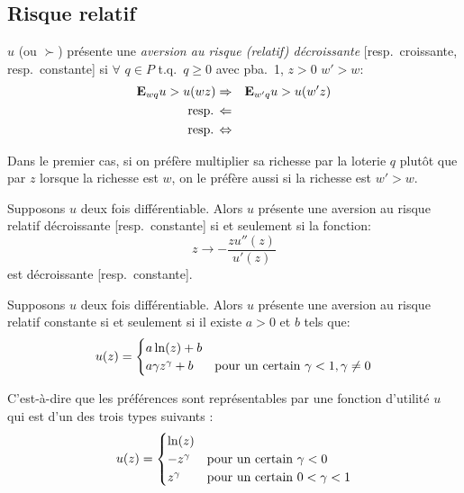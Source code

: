 \subsection{Risque relatif}

\begin{definition}
$u$ (ou $\succ$) pr\'esente une {\em aversion au risque (relatif)
d\'ecroissante} [resp.\, croissante, resp.\, constante] si
$\forall$ $q\in P$ t.q.\ $q\geq 0$ avec pba.\, 1, $z>0$ $w'>w$:
\begin{eqnarray*}
\mathbf{E}_{wq}u>u(wz) &\Rightarrow& \mathbf{E}_{w'q}u>u(w'z)\\
\mbox{resp.\,} &\Leftarrow& \\
\mbox{resp.\,} &\Leftrightarrow&
\end{eqnarray*}
\end{definition}

Dans le premier cas, si on pr\'ef\`ere multiplier sa richesse par
la loterie $q$ plut\^ot que par $z$ lorsque la richesse est $w$,
on le pr\'ef\`ere aussi si la richesse est $w'>w$.

\begin{proposition} Supposons $u$ deux fois diff\'erentiable. Alors
$u$ pr\'esente une aversion au risque relatif d\'ecroissante
[resp.\, constante] si et seulement si la fonction:
$$
z\to  - \frac{zu''(z)}{u'(z)}
$$
est d\'ecroissante [resp.\, constante].
\end{proposition}

\begin{proposition} Supposons $u$ deux fois diff\'erentiable.
Alors $u$ pr\'esente une aversion au risque relatif constante si
et seulement si il existe $a>0$ et $b$ tels que:
$$
u(z)=
\begin{cases}
  a\ln(z)+b &\cr
  a \gamma z^{\gamma}+b  &\mbox{pour un certain }\gamma<1, \gamma\neq 0
\end{cases}
$$
\end{proposition}

C'est-à-dire que les préférences sont représentables par une
fonction d'utilité $u$ qui est d'un des trois types suivants :
$$
u(z)=
\begin{cases}
  \ln(z) & \cr
  - z^{\gamma}  &\mbox{pour un certain }\gamma<0\cr
    z^{\gamma}  &\mbox{pour un certain } 0<\gamma<1
\end{cases}
$$

